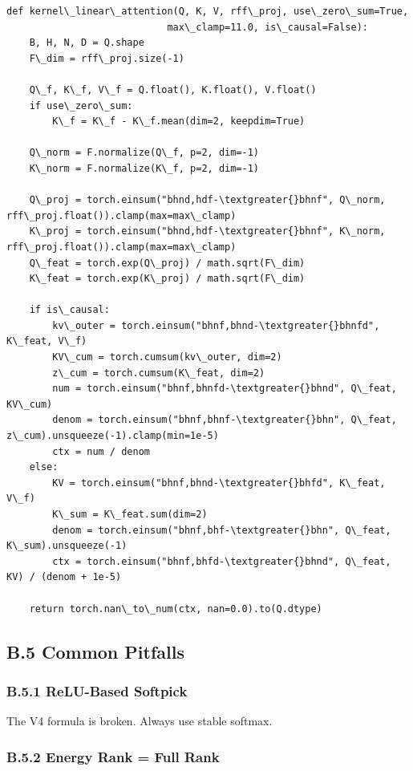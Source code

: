 \begin{lstlisting}
def kernel\_linear\_attention(Q, K, V, rff\_proj, use\_zero\_sum=True, 
                            max\_clamp=11.0, is\_causal=False):
    B, H, N, D = Q.shape
    F\_dim = rff\_proj.size(-1)
    
    Q\_f, K\_f, V\_f = Q.float(), K.float(), V.float()
    if use\_zero\_sum:
        K\_f = K\_f - K\_f.mean(dim=2, keepdim=True)
    
    Q\_norm = F.normalize(Q\_f, p=2, dim=-1)
    K\_norm = F.normalize(K\_f, p=2, dim=-1)
    
    Q\_proj = torch.einsum("bhnd,hdf-\textgreater{}bhnf", Q\_norm, rff\_proj.float()).clamp(max=max\_clamp)
    K\_proj = torch.einsum("bhnd,hdf-\textgreater{}bhnf", K\_norm, rff\_proj.float()).clamp(max=max\_clamp)
    Q\_feat = torch.exp(Q\_proj) / math.sqrt(F\_dim)
    K\_feat = torch.exp(K\_proj) / math.sqrt(F\_dim)
    
    if is\_causal:
        kv\_outer = torch.einsum("bhnf,bhnd-\textgreater{}bhnfd", K\_feat, V\_f)
        KV\_cum = torch.cumsum(kv\_outer, dim=2)
        z\_cum = torch.cumsum(K\_feat, dim=2)
        num = torch.einsum("bhnf,bhnfd-\textgreater{}bhnd", Q\_feat, KV\_cum)
        denom = torch.einsum("bhnf,bhnf-\textgreater{}bhn", Q\_feat, z\_cum).unsqueeze(-1).clamp(min=1e-5)
        ctx = num / denom
    else:
        KV = torch.einsum("bhnf,bhnd-\textgreater{}bhfd", K\_feat, V\_f)
        K\_sum = K\_feat.sum(dim=2)
        denom = torch.einsum("bhnf,bhf-\textgreater{}bhn", Q\_feat, K\_sum).unsqueeze(-1)
        ctx = torch.einsum("bhnf,bhfd-\textgreater{}bhnd", Q\_feat, KV) / (denom + 1e-5)
    
    return torch.nan\_to\_num(ctx, nan=0.0).to(Q.dtype)
\end{lstlisting}

\subsection{B.5 Common Pitfalls}

\subsubsection{B.5.1 ReLU-Based Softpick}

The V4 formula is broken. Always use stable softmax.

\subsubsection{B.5.2 Energy Rank = Full Rank}

